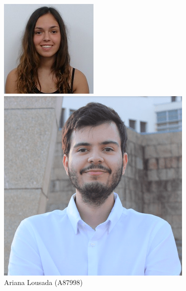 \documentclass[a4paper]{report}
\begin{document}
\begin{figure}[H]
  \centering
  \begin{minipage}[b]{0.2\textwidth}
    \centering
    \includegraphics[width=\textwidth]{images/ariana.jpg}
    \caption*{Ariana Lousada (A87998)}
  \end{minipage}
  \hfill
  \begin{minipage}[b]{0.2\textwidth}
    \centering
    \includegraphics[width=\textwidth]{images/carlos.png}

\end{minipage}
\end{figure}
\end{document}
